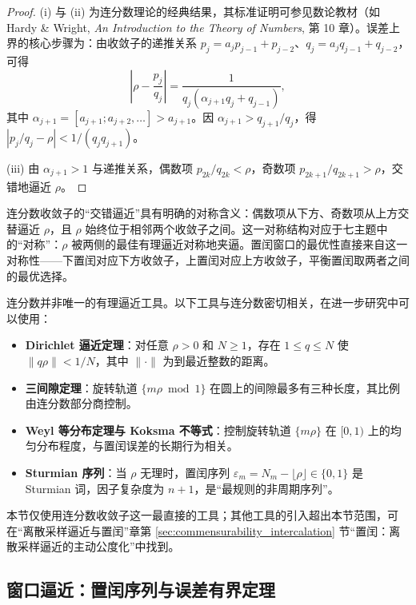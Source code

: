 \begin{proof}
(i) 与 (ii) 为连分数理论的经典结果，其标准证明可参见数论教材（如 Hardy \& Wright, \textit{An Introduction to the Theory of Numbers}, 第 10 章）。误差上界的核心步骤为：由收敛子的递推关系 $p_j=a_jp_{j-1}+p_{j-2}$、$q_j=a_jq_{j-1}+q_{j-2}$，可得
\[
\left|\rho-\frac{p_j}{q_j}\right|=\frac{1}{q_j(\alpha_{j+1}q_j+q_{j-1})},
\]
其中 $\alpha_{j+1}=[a_{j+1};a_{j+2},\dots]>a_{j+1}$。因 $\alpha_{j+1}>q_{j+1}/q_j$，得 $|p_j/q_j-\rho|<1/(q_jq_{j+1})$。

(iii) 由 $\alpha_{j+1}>1$ 与递推关系，偶数项 $p_{2k}/q_{2k}<\rho$，奇数项 $p_{2k+1}/q_{2k+1}>\rho$，交错地逼近 $\rho$。
\end{proof}

\begin{remark}[最佳逼近的对称结构]\label{rem:best_approx_symmetry}
连分数收敛子的“交错逼近”具有明确的对称含义：偶数项从下方、奇数项从上方交替逼近 $\rho$，且 $\rho$ 始终位于相邻两个收敛子之间。这一对称结构对应于七主题中的“对称”：$\rho$ 被两侧的最佳有理逼近对称地夹逼。置闰窗口的最优性直接来自这一对称性——下置闰对应下方收敛子，上置闰对应上方收敛子，平衡置闰取两者之间的最优选择。
\end{remark}

\begin{remark}[其他有理逼近工具]\label{rem:other_rational_approximations}
连分数并非唯一的有理逼近工具。以下工具与连分数密切相关，在进一步研究中可以使用：
\begin{itemize}
    \item \textbf{Dirichlet 逼近定理}：对任意 $\rho>0$ 和 $N\ge 1$，存在 $1\le q\le N$ 使 $\|q\rho\|<1/N$，其中 $\|\cdot\|$ 为到最近整数的距离。
    \item \textbf{三间隙定理}：旋转轨道 $\{m\rho\bmod 1\}$ 在圆上的间隙最多有三种长度，其比例由连分数部分商控制。
    \item \textbf{Weyl 等分布定理与 Koksma 不等式}：控制旋转轨道 $\{m\rho\}$ 在 $[0,1)$ 上的均匀分布程度，与置闰误差的长期行为相关。
    \item \textbf{Sturmian 序列}：当 $\rho$ 无理时，置闰序列 $\varepsilon_m=N_m-\lfloor\rho\rfloor\in\{0,1\}$ 是 Sturmian 词，因子复杂度为 $n+1$，是“最规则的非周期序列”。
\end{itemize}
本节仅使用连分数收敛子这一最直接的工具；其他工具的引入超出本节范围，可在“离散采样逼近与置闰”章第 \ref{sec:commensurability_intercalation} 节“置闰：离散采样逼近的主动公度化”中找到。
\end{remark}

\subsection{窗口逼近：置闰序列与误差有界定理}

